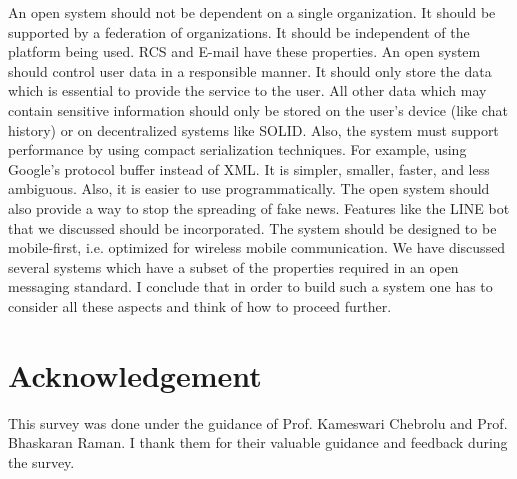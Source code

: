 \documentclass[11pt, conference, a4paper]{IEEEtran}
\begin{document}
An open system should not be dependent on a single organization. It should be supported by a federation of organizations. It should be independent of the platform being used. RCS and E-mail have these properties. 
An open system should control user data in a responsible manner. It should only store the data which is essential to provide the service to the user. All other data which may contain sensitive information should only be stored on the user's device (like chat history) or on decentralized systems like SOLID.  
Also, the system must support performance by using compact serialization techniques. For example, using Google’s protocol buffer instead of XML. It is simpler, smaller, faster, and less ambiguous. Also, it is easier to use programmatically. 
The open system should also provide a way to stop the spreading of fake news. Features like the LINE bot that we discussed should be incorporated. The system should be designed to be mobile-first,        i.e. optimized for wireless mobile communication. 
We have discussed several systems which have a subset of the properties required in an open messaging standard. I conclude that in order to build such a system one has to consider all these aspects and think of how to proceed further.

\section{Acknowledgement}
\label{SEC:acknowledgement}
This survey was done under the guidance of Prof. Kameswari Chebrolu and Prof. Bhaskaran Raman. I thank them for their valuable guidance and feedback during the survey.



\newpage
\nocite{*}
\printbibliography
\end{document}
